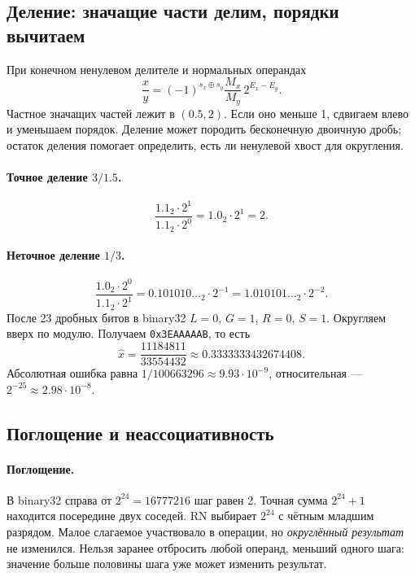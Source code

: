 \subsection{Деление: значащие части делим, порядки вычитаем}
При конечном ненулевом делителе и нормальных операндах
\[
\frac{x}{y}=(-1)^{s_x\oplus s_y}\frac{M_x}{M_y}\,2^{E_x-E_y}.
\]
Частное значащих частей лежит в $(0.5,2)$. Если оно меньше 1,
сдвигаем влево и уменьшаем порядок. Деление может породить
бесконечную двоичную дробь; остаток деления помогает определить,
есть ли ненулевой хвост для округления.

\paragraph{Точное деление $3/1.5$.}
\[
\frac{1.1_2\cdot2^1}{1.1_2\cdot2^0}=1.0_2\cdot2^1=2.
\]
\paragraph{Неточное деление $1/3$.}
\[
\frac{1.0_2\cdot2^0}{1.1_2\cdot2^1}
=0.101010\ldots_2\cdot2^{-1}
=1.010101\ldots_2\cdot2^{-2}.
\]
После 23 дробных битов в binary32 $L=0$, $G=1$, $R=0$, $S=1$.
Округляем вверх по модулю. Получаем \texttt{0x3EAAAAAB}, то есть
\[
\hat x=\frac{11184811}{33554432}
\approx0.3333333432674408.
\]
Абсолютная ошибка равна $1/100663296\approx9.93\cdot10^{-9}$,
относительная --- $2^{-25}\approx2.98\cdot10^{-8}$.

\subsection{Поглощение и неассоциативность}
\paragraph{Поглощение.}
В binary32 справа от $2^{24}=16777216$ шаг равен 2.
Точная сумма $2^{24}+1$ находится посередине двух соседей.
RN выбирает $2^{24}$ с чётным младшим разрядом.
Малое слагаемое участвовало в операции, но \emph{округлённый результат}
не изменился. Нельзя заранее отбросить любой операнд, меньший одного
шага: значение больше половины шага уже может изменить результат.

